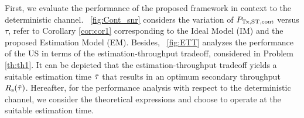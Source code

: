 First, we evaluate the performance of the proposed framework in context to the deterministic channel. \figurename~\ref{fig:Cont_snr} considers the variation of $P_{\text{Tx,ST,cont}}$ versus $\tau$, refer to Corollary \ref{cor:cor1} corresponding to the Ideal Model (IM) and the proposed Estimation Model (EM).   
Besides, \figurename~\ref{fig:ETT} analyzes the performance of the US in terms of the estimation-throughput tradeoff, considered in Problem \ref{th:th1}. %
It can be depicted that the estimation-throughput tradeoff yields a suitable estimation time $\tilde{\tau}$ that results in an optimum secondary throughput $R_{\text{s}}(\tilde{\tau})$. Hereafter, for the performance analysis with respect to the deterministic channel, we consider the theoretical expressions and choose to operate at the suitable estimation time. 

